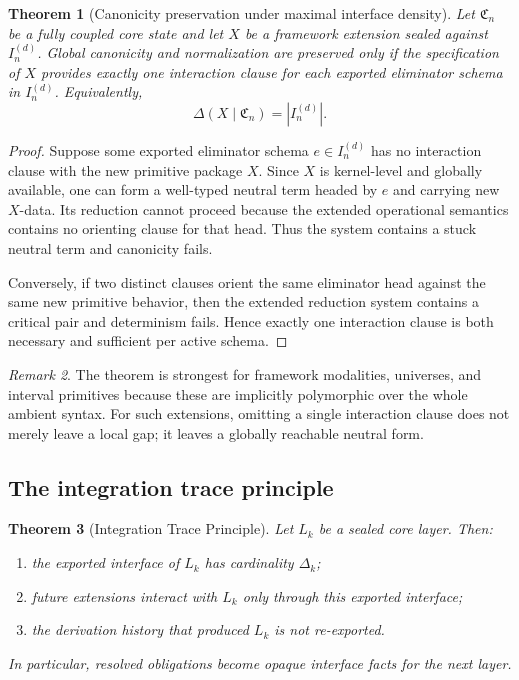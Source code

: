\documentclass{lmcs}
\theoremstyle{plain}
\newtheorem{thm}{Theorem}[section]
\theoremstyle{definition}
\theoremstyle{remark}
\newtheorem{rem}[thm]{Remark}
\newcommand{\Core}{\ensuremath{\mathfrak{C}}}
\begin{document}
\begin{thm}[Canonicity preservation under maximal interface density]
\label{thm:canonicity}
Let $\Core_n$ be a fully coupled core state and let $X$ be a framework extension sealed against $I_n^{(d)}$.
Global canonicity and normalization are preserved only if the specification of $X$ provides exactly one interaction clause for each exported eliminator schema in $I_n^{(d)}$.
Equivalently,
\[
  \Delta(X \mid \Core_n)=|I_n^{(d)}|.
\]
\end{thm}

\begin{proof}
Suppose some exported eliminator schema $e\in I_n^{(d)}$ has no interaction clause with the new primitive package $X$.
Since $X$ is kernel-level and globally available, one can form a well-typed neutral term headed by $e$ and carrying new $X$-data.
Its reduction cannot proceed because the extended operational semantics contains no orienting clause for that head.
Thus the system contains a stuck neutral term and canonicity fails.

Conversely, if two distinct clauses orient the same eliminator head against the same new primitive behavior, then the extended reduction system contains a critical pair and determinism fails.
Hence exactly one interaction clause is both necessary and sufficient per active schema.
\end{proof}

\begin{rem}
The theorem is strongest for framework modalities, universes, and interval primitives because these are implicitly polymorphic over the whole ambient syntax.
For such extensions, omitting a single interaction clause does not merely leave a local gap; it leaves a globally reachable neutral form.
\end{rem}

\subsection{The integration trace principle}

\begin{thm}[Integration Trace Principle]
\label{thm:trace}
Let $L_k$ be a sealed core layer.
Then:
\begin{enumerate}[label=(\arabic*),nosep]
  \item the exported interface of $L_k$ has cardinality $\Delta_k$;
  \item future extensions interact with $L_k$ only through this exported interface;
  \item the derivation history that produced $L_k$ is not re-exported.
\end{enumerate}
In particular, resolved obligations become opaque interface facts for the next layer.
\end{thm}
\end{document}
